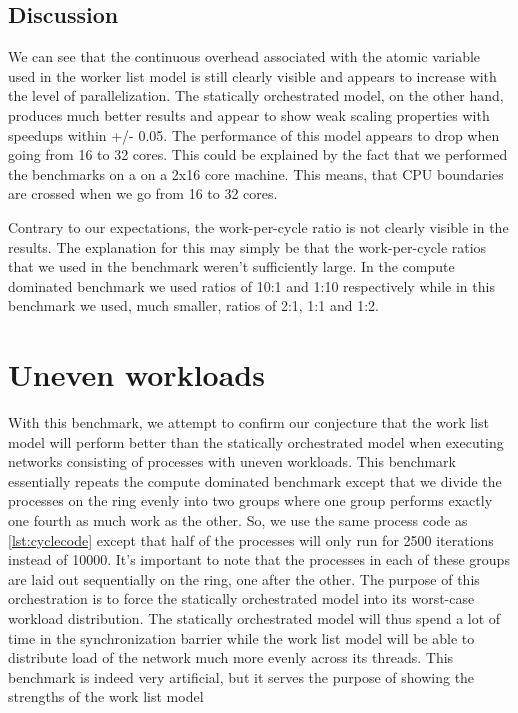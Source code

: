 \subsection{Discussion}
We can see that the continuous overhead associated with the atomic variable used in
the worker list model is still clearly visible and appears to
increase with the level of parallelization. The statically
orchestrated model, on the other hand, produces much better results
and appear to show weak scaling properties with speedups within +/-
0.05. The performance of this model appears to drop when
going from 16 to 32 cores. This could be explained by the fact that we
performed the benchmarks on a on a 2x16 core machine. This means, that
CPU boundaries are crossed when we go from 16 to 32 cores.

Contrary to our expectations, the work-per-cycle ratio is not clearly
visible in the results. The explanation for this may simply be that
the work-per-cycle ratios that we used in the benchmark weren't
sufficiently large. In the compute dominated benchmark we used ratios of
10:1 and 1:10 respectively while in this benchmark we used, much
smaller, ratios of
2:1, 1:1 and 1:2.


\section{Uneven workloads}
With this benchmark, we attempt to confirm our conjecture that the
work list model will perform better than the statically orchestrated
model when executing networks consisting of processes with uneven
workloads. This benchmark essentially repeats the compute dominated
benchmark except that we divide the processes on the ring evenly into
two groups where one group performs exactly one fourth as much work as
the other. So, we use the same process code as \cref{lst:cyclecode}
except that half of the processes will only run for 2500 iterations
instead of 10000. It's important to note that the processes in each of
these groups are laid out sequentially on the ring, one after the
other. The purpose of this orchestration is to force the statically
orchestrated model into its worst-case workload distribution. The
statically orchestrated model will thus spend a lot of time in the
synchronization barrier while the work list model will be able to
distribute load of the network much more evenly across its
threads. This benchmark is indeed very artificial, but it serves the
purpose of showing the strengths of the work list model

